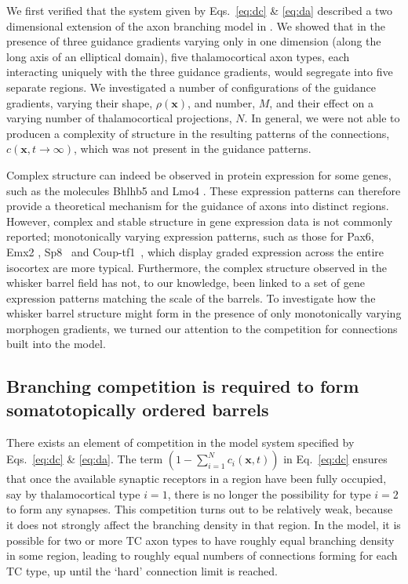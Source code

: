 \documentclass[a4paper,11pt]{article}
\newcommand{\cmnt}[1]{\textcolor{blue}{#1}}
\newcommand{\mb}[1]{\mathbf{#1}}
\begin{document}
We first verified that the system given by Eqs.~\ref{eq:dc} \& \ref{eq:da}
described a two dimensional extension of the axon branching model in
\citet{karbowski_model_2004}. We showed that in the presence of three guidance
gradients varying only in one dimension (along the long axis of an elliptical
domain), five thalamocortical axon types, each interacting uniquely with the
three guidance gradients, would segregate into five separate regions. We
investigated a number of configurations of the guidance gradients, varying
their shape, $\rho(\mb{x})$, and number, $M$, and their effect on a varying
number of thalamocortical projections, $N$. In general, we were not able to
producen a complexity of structure in the resulting patterns of the
connections, $c(\mb{x},t\rightarrow\infty)$, which was not present in the
guidance patterns.

Complex structure can indeed be observed in protein expression for some genes,
such as the molecules Bhlhb5 \citep{joshi_bhlhb5_2008} and Lmo4
\citep{cederquist_lmo4_2013,greig_molecular_2013}. These expression patterns
can therefore provide a theoretical mechanism for the guidance of axons into
distinct regions.
However, complex and stable structure in gene expression data is not commonly
reported; monotonically varying expression patterns, such as those for Pax6,
Emx2 \citep{shimogori_fibroblast_2005,bishop_regulation_2000},
Sp8~\citep{sahara_sp8_2007} and Coup-tf1~\citep{borello_sp8_2014}, which
display graded expression across the entire isocortex are more
typical. Furthermore, the complex structure observed in the whisker barrel
field has not, to our knowledge, been linked to a set of gene expression
patterns matching the scale of the barrels. To investigate how the whisker
barrel structure might form in the presence of only monotonically varying
morphogen gradients, we turned our attention to the competition for
connections built into the model.


\subsection*{Branching competition is required to form somatotopically ordered barrels}

There exists an element of competition in the model system specified by
Eqs.~\ref{eq:dc} \& \ref{eq:da}. The term $\left(1 - \sum_{i=1}^{N}
c_i(\mb{x}, t)\right)$ in Eq.~\ref{eq:dc} ensures that once the available
synaptic receptors in a region have been fully occupied, say by
thalamocortical type $i=1$, there is no longer the possibility for type $i=2$
to form any synapses. This competition turns out to be relatively weak,
because it does not strongly affect the branching density in that region. In
the model, it is possible for two or more TC axon types to have roughly equal
branching density in some region, leading to roughly equal numbers of
connections forming for each TC type, up until the `hard' connection limit
is reached.
\end{document}

